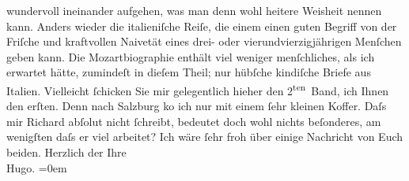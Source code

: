 \begin{ledgroupsized}[t]{13cm}
               wundervoll ineinander aufgehen, was man denn wohl heitere {\pb}Weisheit nennen kann. Anders
               wieder die italieniſche Reiſe, die einem einen
               guten Begriff von der Friſche und kraftvollen Naivetät eines drei- oder
               vierundvierzigjährigen Menſchen geben kann.\pend
           \pstart
           Die Mozartbiographie enthält viel weniger
               menſchliches, als ich erwartet hätte, zumindeſt in dieſem Theil; nur hübſche
               kindiſche Briefe aus Italien. Vielleicht
               ſchicken Sie mir gelegentlich hieher den 2\textsuperscript{ten} Band, ich
               Ihnen {\pb}den erſten. Denn nach Salzburg ko{\geminationm} ich nur
               mit einem ſehr kleinen Koffer. Daſs mir Richard abſolut nicht ſchreibt, bedeutet doch wohl nichts beſonderes, am
               wenigſten daſs er viel arbeitet?\pend
           \pstart
           Ich wäre ſehr froh über einige Nachricht von Euch beiden.\pend
           \pstart
           Herzlich der Ihre{\\[\baselineskip]}\spacefill\mbox{Hugo.}\pend
           \leftskip=0em{}
         
         \endnumbering{}\end{ledgroupsized}  \newcommand{\dateiname}{L00693}\newcommand{\titel}{Hugo von Hofmannsthal an Arthur Schnitzler, 6. 7. [1897]}\newcommand{\editorInnen}{Martin Anton Müller und Gerd-Hermann Susen}
      
